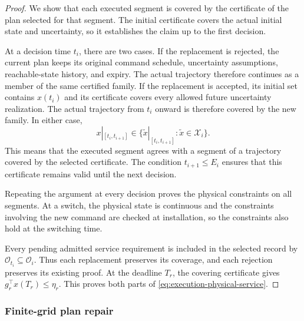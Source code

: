 \documentclass[preprint,12pt]{elsarticle}
\begin{document}
\begin{proof}
We show that each executed segment is covered by the certificate of the
plan selected for that segment. The initial certificate covers the actual
initial state and uncertainty, so it establishes the claim up to the first
decision.

At a decision time $t_i$, there are two cases. If the replacement is
rejected, the current plan keeps its original command schedule,
uncertainty assumptions, reachable-state history, and expiry. The actual
trajectory therefore continues as a member of the same certified family.
If the replacement is accepted, its initial set contains $x(t_i)$ and its
certificate covers every allowed future uncertainty realization. The
actual trajectory from $t_i$ onward is therefore covered by the new
family. In either case,
\[
 x|_{[t_i,t_{i+1}]}\in
 \{\widetilde x|_{[t_i,t_{i+1}]}:
          \widetilde x\in\mathcal X_i\}.
\]
This means that the executed segment agrees with a segment of a trajectory
covered by the selected certificate. The condition $t_{i+1}\le E_i$
ensures that this certificate remains valid until the next decision.

Repeating the argument at every decision proves the physical constraints
on all segments. At a switch, the physical state is continuous and the
constraints involving the new command are checked at installation, so the
constraints also hold at the switching time.

Every pending admitted service requirement is included in the selected
record by $\mathcal O_{t_i}\subseteq\mathcal O_i$. Thus each replacement
preserves its coverage, and each rejection preserves its existing proof.
At the deadline $T_r$, the covering certificate gives
$g_r^\top x(T_r)\le\eta_r$. This proves both parts of
\eqref{eq:execution-physical-service}.
\end{proof}

\subsubsection{Finite-grid plan repair}
\label{sec:predictive-repair}
\end{document}
